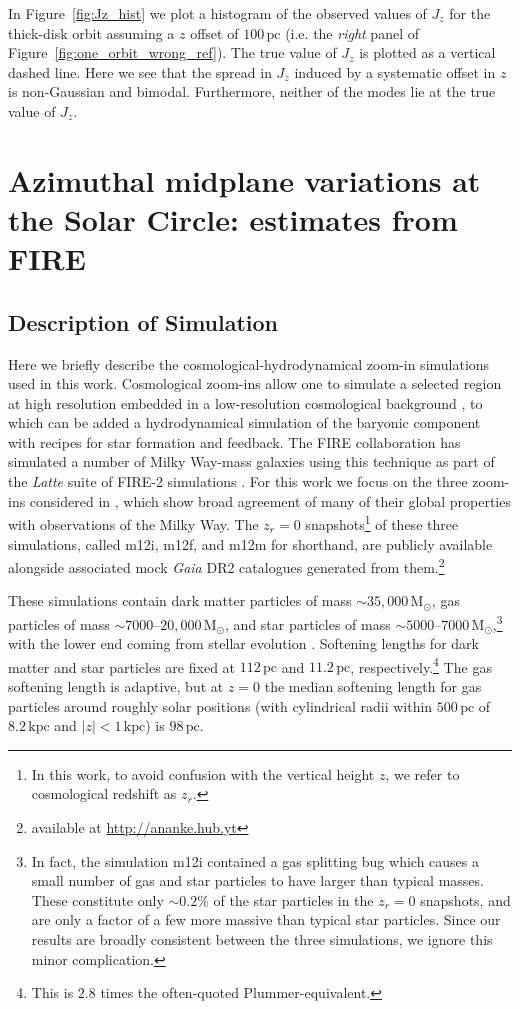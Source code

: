 \documentclass[twocolumn]{aastex62}
\newcommand{\Msun}{\ensuremath{\text{M}_\odot}}
\newcommand{\pc}{\text{pc}}
\newcommand{\kpc}{\text{kpc}}
\newcommand{\abs}[1]{\left| #1 \right|}
\newcommand{\z}{z_r}
\begin{document}
In Figure~\ref{fig:Jz_hist} we plot a histogram of the observed values of
$J_z$ for the thick-disk orbit assuming a $z$ offset of $100\,\pc$ (i.e. the
{\em right} panel of Figure~\ref{fig:one_orbit_wrong_ref}). The true value of
$J_z$ is plotted as a vertical dashed line. Here we see that the spread in
$J_z$ induced by a systematic offset in $z$ is non-Gaussian and bimodal.
Furthermore, neither of the modes lie at the true value of $J_z$.

\section{Azimuthal midplane variations at the Solar Circle: estimates from
FIRE} \label{sec:local_fire}
\subsection{Description of Simulation} \label{ssec:cosmozoom}
Here we briefly describe the cosmological-hydrodynamical zoom-in simulations
used in this work. Cosmological zoom-ins allow one to simulate a selected
region at high resolution embedded in a low-resolution cosmological background
\citep[e.g.][]{1993ApJ...412..455K,2014MNRAS.437.1894O}, to which can be added
a hydrodynamical simulation of the baryonic component with recipes for star
formation and feedback. The FIRE collaboration has simulated a number of Milky
Way-mass galaxies using this technique as part of the {\em Latte} suite of
FIRE-2 simulations \citep{2016ApJ...827L..23W,2018MNRAS.481.4133G}. For this
work we focus on the three zoom-ins considered in \citet{2018arXiv180610564S},
which show broad agreement of many of their global properties with
observations of the Milky Way. The $\z=0$ snapshots\footnote{In this work, to
avoid confusion with the vertical height $z$, we refer to cosmological
redshift as $\z$.} of these three simulations, called m12i, m12f, and m12m for
shorthand, are publicly available alongside associated mock {\em Gaia} DR2
catalogues generated from them.\footnote{available at
\url{http://ananke.hub.yt}}

These simulations contain dark matter particles of mass $\sim35,000\,\Msun$,
gas particles of mass $\sim 7000 \text{--} 20,000\,\Msun$, and star particles
of mass $\sim 5000 \text{--} 7000\,
\Msun$,\footnote{In fact, the simulation m12i contained a gas
splitting bug which causes a small number of gas and star particles to have
larger than typical masses. These constitute only $\sim0.2\%$ of the star
particles in the $\z=0$ snapshots, and are only a factor of a few more massive
than typical star particles. Since our results are broadly consistent between
the three simulations, we ignore this minor complication.} with the lower end
coming from stellar evolution \citep{2018arXiv180610564S}. Softening lengths
for dark matter and star particles are fixed at $112\,\pc$ and $11.2\,\pc$,
respectively.\footnote{This is $2.8$ times the often-quoted
Plummer-equivalent.} The gas softening length is adaptive, but at $z=0$ the
median softening length for gas particles around roughly solar positions (with
cylindrical radii within $500\,\pc$ of $8.2\,\kpc$ and $\abs{z}<1\,\kpc$) is
$98\,\pc$. %
\end{document}
